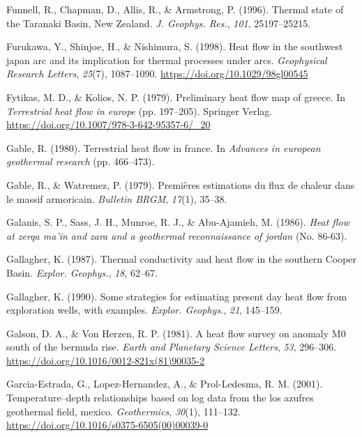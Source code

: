 \begin{CSLReferences}{1}{1}
\leavevmode{}%
Funnell, R., Chapman, D., Allis, R., \& Armstrong, P. (1996). Thermal state of the {Taranaki Basin, New Zealand}. \emph{J. Geophys. Res.}, \emph{101}, 25197--25215.

\leavevmode{}%
Furukawa, Y., Shinjoe, H., \& Nishimura, S. (1998). Heat flow in the southwest japan arc and its implication for thermal processes under arcs. \emph{Geophysical Research Letters}, \emph{25}(7), 1087--1090. \url{https://doi.org/10.1029/98gl00545}

\leavevmode{}%
Fytikas, M. D., \& Kolios, N. P. (1979). Preliminary heat flow map of greece. In \emph{Terrestrial heat flow in europe} (pp. 197--205). Springer Verlag. \url{https://doi.org/10.1007/978-3-642-95357-6/_20}

\leavevmode{}%
Gable, R. (1980). Terrestrial heat flow in france. In \emph{Advances in european geothermal research} (pp. 466--473).

\leavevmode{}%
Gable, R., \& Watremez, P. (1979). Premières estimations du flux de chaleur dans le massif armoricain. \emph{Bulletin BRGM}, \emph{17}(1), 35--38.

\leavevmode{}%
Galanis, S. P., Sass, J. H., Munroe, R. J., \& Abu-Ajamieh, M. (1986). \emph{Heat flow at zerqa ma'in and zara and a geothermal reconnaissance of jordan} (No. 86-63).

\leavevmode{}%
Gallagher, K. (1987). Thermal conductivity and heat flow in the southern {Cooper Basin}. \emph{Explor. Geophys.}, \emph{18}, 62--67.

\leavevmode{}%
Gallagher, K. (1990). Some strategies for estimating present day heat flow from exploration wells, with examples. \emph{Explor. Geophys.}, \emph{21}, 145--159.

\leavevmode{}%
Galson, D. A., \& Von Herzen, R. P. (1981). A heat flow survey on anomaly M0 south of the bermuda rise. \emph{Earth and Planetary Science Letters}, \emph{53}, 296--306. \url{https://doi.org/10.1016/0012-821x(81)90035-2}

\leavevmode{}%
Garcia-Estrada, G., Lopez-Hernandez, A., \& Prol-Ledesma, R. M. (2001). Temperature--depth relationships based on log data from the los azufres geothermal field, mexico. \emph{Geothermics}, \emph{30}(1), 111--132. \url{https://doi.org/10.1016/s0375-6505(00)00039-0}


\end{CSLReferences}
